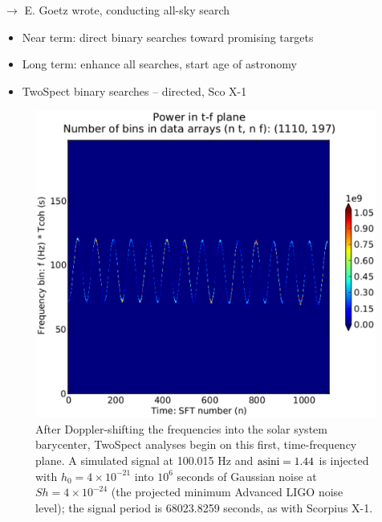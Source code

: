 $\rightarrow$ E. Goetz wrote, conducting all-sky search




\begin{itemize}
\item Near term: direct binary searches toward promising targets
\item Long term: enhance all searches, start age of astronomy
\item TwoSpect binary searches -- directed, Sco X-1
\end{itemize}


\begin{figure}
\begin{center}
\includegraphics[width=0.8\paperwidth,height=0.4\paperheight]{tfplane-4e21-on-4e24.eps}
\caption{After Doppler-shifting the frequencies into the solar system barycenter, TwoSpect analyses begin on this first, time-frequency plane. A simulated signal at 100.015 Hz and $\textup{asini} = 1.44$ is injected with $h_0 = 4\times 10^{-21}$ into $10^6$ seconds of Gaussian noise at $Sh = 4 \times 10^{-24}$ (the projected minimum Advanced LIGO noise level); the signal period is 68023.8259 seconds, as with Scorpius X-1.}
\end{center}
\end{figure}

